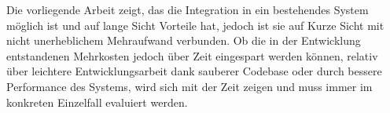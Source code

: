 Die vorliegende Arbeit zeigt, das die Integration in ein bestehendes System möglich ist und auf lange Sicht Vorteile hat, jedoch ist sie auf Kurze Sicht mit nicht unerheblichem Mehraufwand verbunden. Ob die in der Entwicklung entstandenen Mehrkosten jedoch über Zeit eingespart werden können, relativ über leichtere Entwicklungsarbeit dank sauberer Codebase oder durch bessere Performance des Systems, wird sich mit der Zeit zeigen und muss immer im konkreten Einzelfall evaluiert werden.